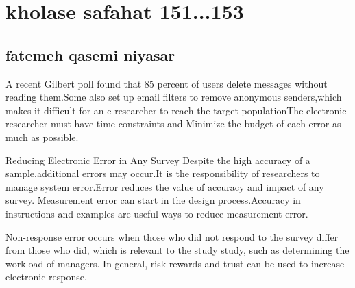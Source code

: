 \documentclass [12pt]{beamer}
\begin{document}
\section*{kholase safahat 151...153}
\subsection*{fatemeh qasemi niyasar}	
\begin{frame}
	
\justifying		
A recent Gilbert poll found that 85 percent of users delete  messages without reading them.Some also set up email filters to remove anonymous
senders,which makes it difficult for an e-researcher to reach the target populationThe electronic researcher must have time constraints and
Minimize the budget of each error as much as possible.

\end{frame}

\begin{frame}
\justifying	
Reducing Electronic Error in Any Survey Despite the high accuracy of a sample,additional errors may occur.It is the responsibility of researchers to manage system error.Error reduces the value of accuracy and impact of any survey.
Measurement error can start in the design process.Accuracy in instructions and examples are useful ways to reduce measurement error.
	
\end{frame}	

\begin{frame}
\justifying	
Non-response error occurs when those who did not respond to the survey differ from those who did, which is relevant to the study study, such as determining the workload of managers.  In general, risk rewards and trust can be used to increase electronic response.
 
\end{frame}	
			
\end{document}
